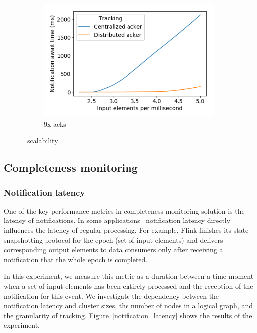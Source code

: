 \begin{figure}[t!]
\begin{subfigure}[b]{0.32\textwidth}
            \includegraphics[width=0.99\textwidth]{pics/scalability_09x.png}
            \caption{9x acks}
            \label{9x_acks}
	\end{subfigure}
    \caption{\tracker\ scalability}
    \label{notification_scalability}
\end{figure}

\subsection{Completeness monitoring} \label{completeness}

\subsubsection{Notification latency}

One of the key performance metrics in completeness monitoring solution is the latency of notifications. In some applications~\cite{Carbone:2017:SMA:3137765.3137777, we2018adbis} notification latency directly influences the latency of regular processing. For example, Flink finishes its state snapshotting protocol for the epoch (set of input elements) and delivers corresponding output elements to data consumers only after receiving a notification that the whole epoch is completed. 

In this experiment, we measure this metric as a duration between a time moment when a set of input elements has been entirely processed and the reception of the notification for this event. We investigate the dependency between the notification latency and cluster sizes, the number of nodes in a logical graph, and the granularity of tracking. Figure~\ref{notification_latency} shows the results of the experiment. 

